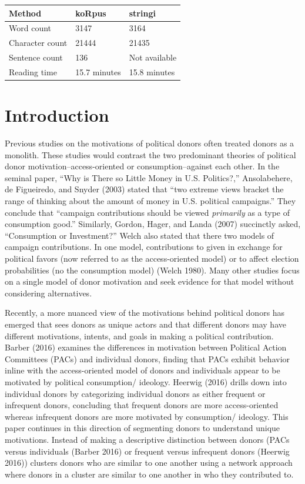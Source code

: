 \documentclass[12pt,]{article}
\begin{document}
\vskip -8.5pt



\noindent \doublespacing 

\begin{longtable}[]{@{}lll@{}}
\toprule
Method & koRpus & stringi\tabularnewline
\midrule
\endhead
Word count & 3147 & 3164\tabularnewline
Character count & 21444 & 21435\tabularnewline
Sentence count & 136 & Not available\tabularnewline
Reading time & 15.7 minutes & 15.8 minutes\tabularnewline
\bottomrule
\end{longtable}

\newpage

\hypertarget{introduction}{%
\section{Introduction}\label{introduction}}

Previous studies on the motivations of political donors often treated
donors as a monolith. These studies would contrast the two predominant
theories of political donor motivation--access-oriented or
consumption--against each other. In the seminal paper, ``Why is There so
Little Money in U.S. Politics?,'' Ansolabehere, de Figueiredo, and
Snyder (2003) stated that ``two extreme views bracket the range of
thinking about the amount of money in U.S. political campaigns.'' They
conclude that ``campaign contributions should be viewed \emph{primarily}
as a type of consumption good.'' Similarly, Gordon, Hager, and Landa
(2007) succinctly asked, ``Consumption or Investment?'' Welch also
stated that there two models of campaign contributions. In one model,
contributions to given in exchange for political favors (now referred to
as the access-oriented model) or to affect election probabilities (no
the consumption model) (Welch 1980). Many other studies focus on a
single model of donor motivation and seek evidence for that model
without considering alternatives.

Recently, a more nuanced view of the motivations behind political donors
has emerged that sees donors as unique actors and that different donors
may have different motivations, intents, and goals in making a political
contribution. Barber (2016) examines the differences in motivation
between Political Action Committees (PACs) and individual donors,
finding that PACs exhibit behavior inline with the access-oriented model
of donors and individuals appear to be motivated by political
consumption/ ideology. Heerwig (2016) drills down into individual donors
by categorizing individual donors as either frequent or infrequent
donors, concluding that frequent donors are more access-oriented whereas
infrequent donors are more motivated by consumption/ ideology. This
paper continues in this direction of segmenting donors to understand
unique motivations. Instead of making a descriptive distinction between
donors (PACs versus individuals (Barber 2016) or frequent versus
infrequent donors (Heerwig 2016)) clusters donors who are similar to one
another using a network approach where donors in a cluster are similar
to one another in who they contributed to.
\end{document}

